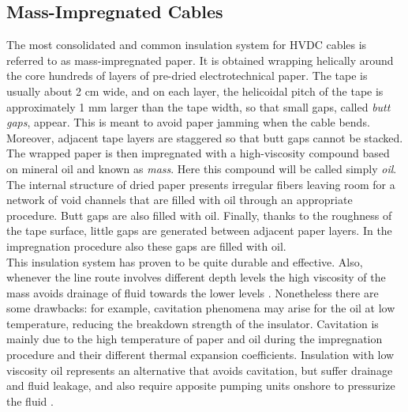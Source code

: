 \documentclass[11pt,a4paper]{article}
\begin{document}
\subsection{Mass-Impregnated Cables}
The most consolidated and common insulation system for HVDC cables is referred to as mass-impregnated paper. It is obtained wrapping helically around the core hundreds of layers of pre-dried electrotechnical paper. The tape is usually about 2 cm wide, and on each layer, the helicoidal pitch of the tape is approximately 1 mm larger than the tape width, so that small gaps, called \textit{butt gaps}, appear. This is meant to avoid paper jamming when the cable bends. Moreover, adjacent tape layers are staggered so that butt gaps cannot be stacked.\\
The wrapped paper is then impregnated with a high-viscosity compound based on mineral oil and known as \textit{mass}. Here this compound will be called simply \textit{oil}. The internal structure of dried paper presents irregular fibers leaving room for a network of void channels that are filled with oil through an appropriate procedure. Butt gaps are also filled with oil. Finally, thanks to the roughness of the tape surface, little gaps are generated between adjacent paper layers. In the impregnation procedure also these gaps are filled with oil.\\
This insulation system has proven to be quite durable and effective. Also, whenever the line route involves different depth levels the high viscosity of the mass avoids drainage of fluid towards the lower levels \cite{ancient_and_modern_cables}. Nonetheless there are some drawbacks: for example, cavitation phenomena may arise for the oil at low temperature, reducing the breakdown strength of the insulator. Cavitation is mainly due to the high temperature of paper and oil during the impregnation procedure and their different thermal expansion coefficients. Insulation with low viscosity oil represents an alternative that avoids cavitation, but suffer drainage and fluid leakage, and also require apposite pumping units onshore to pressurize the fluid \cite{hakonseththesis}.\\
\end{document}
